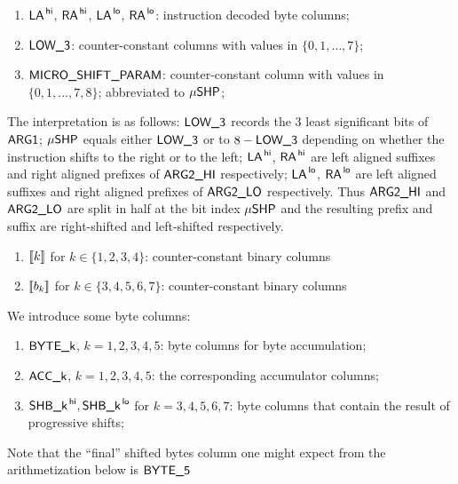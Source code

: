 \begin{enumerate}[resume]
	\item $\textsf{LA}^{\mathsf{\,hi}}$, $\textsf{RA}^{\mathsf{\,hi}}$, $\textsf{LA}^{\mathsf{\,lo}}$, $\textsf{RA}^{\mathsf{\,lo}}$: instruction decoded byte columns;
	\item $\textsf{LOW\_3}$: counter-constant columns with values in $\{0,1,\dots,7\}$;
	\item $\textsf{MICRO\_SHIFT\_PARAM}$: counter-constant column with values in $\{0,1,\dots,7,8\}$; abbreviated to $\textsf{$\mu$SHP}$;
\end{enumerate}
The interpretation is as follows:
$\textsf{LOW\_3}$ records the 3 least significant bits of $\textsf{ARG}\textsf{1}$;
$\textsf{$\mu$SHP}$ equals either $\textsf{LOW\_3}$ or to $8 - \textsf{LOW\_3}$ depending on whether the instruction shifts to the right or to the left;
$\textsf{LA}^{\mathsf{\,hi}}$, $\textsf{RA}^{\mathsf{\,hi}}$ are left aligned suffixes and right aligned prefixes of $\textsf{ARG}\textsf{2}\textsf{\_HI}$ respectively;
$\textsf{LA}^{\mathsf{\,lo}}$, $\textsf{RA}^{\mathsf{\,lo}}$ are left aligned suffixes and right aligned prefixes of $\textsf{ARG}\textsf{2}\textsf{\_LO}$ respectively.
Thus $\textsf{ARG}\textsf{2}\textsf{\_HI}$ and $\textsf{ARG}\textsf{2}\textsf{\_LO}$ are split in half at the bit index $\textsf{$\mu$SHP}$ and the resulting prefix and suffix are right-shifted and left-shifted respectively.
\begin{enumerate}[resume]
	\item $[\![k]\!]$ for $k \in \{1, 2, 3, 4\}$: counter-constant binary columns
	\item $[\![b_{k}]\!]$ for $k \in \{3, 4, 5, 6, 7\}$: counter-constant binary columns
\end{enumerate}
We introduce some byte columns:
\begin{enumerate}[resume]
	\item $\textsf{BYTE}\textsf{\_k}$, $k=1,2,3,4,5$: byte columns for byte accumulation;
	\item $\textsf{ACC}\textsf{\_k}$, $k=1,2,3,4,5$: the corresponding accumulator columns;
	\item $\textsf{SHB\_k}^{\mathsf{\,hi}}, \textsf{SHB\_k}^{\mathsf{\,lo}}$ for $k=3,4,5,6,7$: byte columns that contain the result of progressive shifts;
\end{enumerate}
\noindent Note that the ``final'' shifted bytes column one might expect from the arithmetization below is $\textsf{BYTE}\textsf{\_5}$
